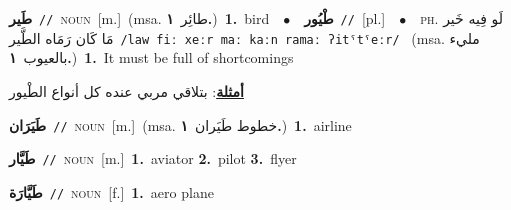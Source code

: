 \documentclass[10pt,a4paper,twoside]{article} %
\begin{document}
\begin{multicols}{2}
{\setlength\topsep{0pt}\textbf{\foreignlanguage{arabic}{طَير}}\ {\color{gray}\texttt{//}\color{black}}\ \textsc{noun}\ [m.]\ \color{gray}(msa. \foreignlanguage{arabic}{طائِر}~\foreignlanguage{arabic}{\textbf{١.}})\color{black}\ \textbf{1.}~bird\ \ $\bullet$\ \ \setlength\topsep{0pt}\textbf{\foreignlanguage{arabic}{طْيُور}}\ {\color{gray}\texttt{//}\color{black}}\ [pl.]\ \ $\bullet$\ \ \textsc{ph.} \color{gray} \foreignlanguage{arabic}{لَو فِيه خَير مَا كَان رَمَاه الطَّير}\color{black}\ {\color{gray}\texttt{/{\sffamily law fiː xeːr maː kaːn ramaː ʔitˤtˤeːr}/}\color{black}}\ \color{gray} (msa. \foreignlanguage{arabic}{مليء بالعيوب}~\foreignlanguage{arabic}{\textbf{١.}})\color{black}\ \textbf{1.}~It must be full of shortcomings\  \begin{flushright}\color{gray}\foreignlanguage{arabic}{\textbf{\underline{\foreignlanguage{arabic}{أمثلة}}}: بتلاقي مربي عنده كل أنواع الطْيور}\end{flushright}\color{black}} \vspace{2mm}

{\setlength\topsep{0pt}\textbf{\foreignlanguage{arabic}{طَيَرَان}}\ {\color{gray}\texttt{//}\color{black}}\ \textsc{noun}\ [m.]\ \color{gray}(msa. \foreignlanguage{arabic}{خطوط طَيَران}~\foreignlanguage{arabic}{\textbf{١.}})\color{black}\ \textbf{1.}~airline\ } \vspace{2mm}

{\setlength\topsep{0pt}\textbf{\foreignlanguage{arabic}{طَيَّار}}\ {\color{gray}\texttt{//}\color{black}}\ \textsc{noun}\ [m.]\ \textbf{1.}~aviator  \textbf{2.}~pilot  \textbf{3.}~flyer\ } \vspace{2mm}

{\setlength\topsep{0pt}\textbf{\foreignlanguage{arabic}{طَيَّارَة}}\ {\color{gray}\texttt{//}\color{black}}\ \textsc{noun}\ [f.]\ \textbf{1.}~aero plane\ } \vspace{2mm}


\end{multicols}
\end{document}
